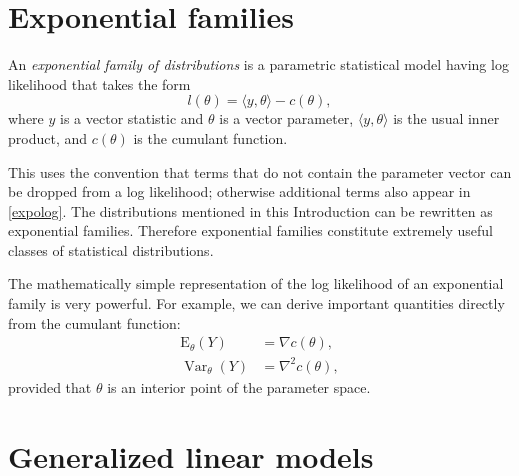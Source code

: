 \documentclass[12pt]{article}
\newcommand{\E}{\mathrm{E}}
\newcommand{\inner}[1]{\langle #1 \rangle}
\DeclareMathOperator{\E}{E}
\DeclareMathOperator{\Var}{Var}
\begin{document}
\section*{Exponential families}

An \emph{exponential family of distributions} is a parametric statistical model having log likelihood that takes the form 
\begin{equation} \label{expolog}
	l(\theta) = \inner{y, \theta} - c(\theta),
\end{equation}
where $y$ is a vector statistic and $\theta$ is a vector parameter, $\inner{y,\theta}$ is the usual inner product, and $c(\theta)$ is the cumulant function.

This uses the convention that terms that do not contain the parameter vector can be dropped from a log likelihood; otherwise additional terms also appear in \eqref{expolog}. The distributions mentioned in this Introduction can be rewritten as exponential families. Therefore exponential families constitute extremely useful classes of statistical distributions.

The mathematically simple representation of the log likelihood of an exponential family is very powerful. For example, we can derive important quantities directly from the cumulant function:
\begin{align*}
  \E_\theta(Y) &= \nabla c(\theta), \\	
  \Var_\theta(Y) &= \nabla^2 c(\theta),
\end{align*}
provided that $\theta$ is an interior point of the parameter space.


\section*{Generalized linear models}
\end{document}
